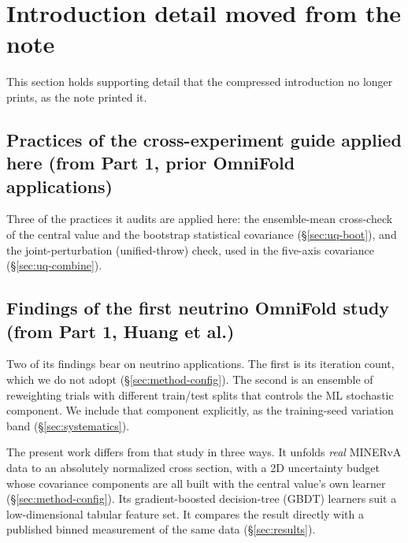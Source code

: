 \section{Introduction detail moved from the note}
This section holds supporting detail that the compressed introduction no longer prints, as the note printed it.

\subsection{Practices of the cross-experiment guide applied here (from Part 1, prior OmniFold applications)}
Three of the practices it audits are applied here: the ensemble-mean cross-check of the central value and the bootstrap statistical covariance (\S\ref{sec:uq-boot}), and the joint-perturbation (unified-throw) check, used in the five-axis covariance (\S\ref{sec:uq-combine}).

\subsection{Findings of the first neutrino OmniFold study (from Part 1, Huang et al.)}
Two of its findings bear on neutrino applications. The first is its iteration count, which we do not adopt (\S\ref{sec:method-config}). The second is an ensemble of reweighting trials with different train/test splits that controls the ML stochastic component. We include that component explicitly, as the training-seed variation band (\S\ref{sec:systematics}).

The present work differs from that study in three ways. It unfolds \emph{real} MINERvA data to an absolutely normalized cross section, with a 2D uncertainty budget whose covariance components are all built with the central value's own learner (\S\ref{sec:method-config}). Its gradient-boosted decision-tree (GBDT) learners suit a low-dimensional tabular feature set. It compares the result directly with a published binned measurement of the same data (\S\ref{sec:results}).

